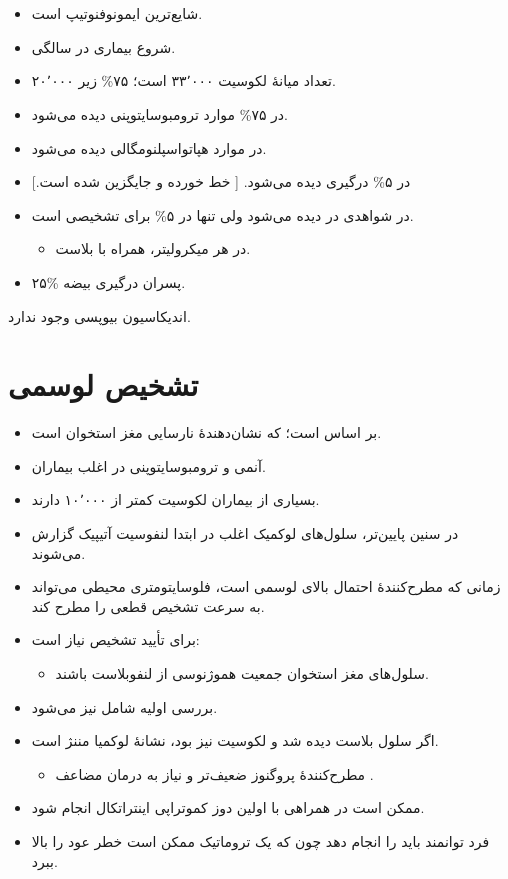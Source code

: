 \documentclass[12pt,a4paper]{article}
\begin{document}
\section*{}
\begin{itemize}
\item شایع‌ترین ایمونوفنوتیپ  است.
\item شروع بیماری در  سالگی.
\item تعداد میانهٔ لکوسیت ۳۳٬۰۰۰ است؛ ۷۵\% زیر ۲۰٬۰۰۰.
\item در ۷۵\% موارد ترومبوسایتوپنی دیده می‌شود.
\item در  موارد هپاتواسپلنومگالی دیده می‌شود.
\item در ۵\% درگیری  دیده می‌شود. [ خط خورده و  جایگزین شده است.]
\item در  شواهدی در  دیده می‌شود ولی تنها در ۵\% برای  تشخیصی است.
\begin{itemize}
\item {} در هر میکرولیتر، همراه با بلاست.
\end{itemize}
\item ۲۵\% پسران درگیری بیضه.
\end{itemize}

اندیکاسیون بیوپسی  وجود ندارد.
\section*{تشخیص لوسمی }
\begin{itemize}
\item بر اساس  است؛ که نشان‌دهندهٔ نارسایی مغز استخوان است.
\item آنمی و ترومبوسایتوپنی در اغلب بیماران.
\item بسیاری از بیماران  لکوسیت کمتر از ۱۰٬۰۰۰ دارند.
\item در سنین پایین‌تر، سلول‌های لوکمیک اغلب در ابتدا لنفوسیت آتیپیک گزارش می‌شوند.
\item زمانی که  مطرح‌کنندهٔ احتمال بالای لوسمی است، فلوسایتومتری محیطی می‌تواند به سرعت تشخیص قطعی را مطرح کند.
\item برای تأیید تشخیص  نیاز است:
\begin{itemize}
\item {} سلول‌های مغز استخوان جمعیت هموژنوسی از لنفوبلاست باشند.
\end{itemize}
\item بررسی اولیه شامل  نیز می‌شود.
\item اگر سلول بلاست دیده شد و لکوسیت  نیز \LeukemiaMath{\uparrow} بود، نشانهٔ لوکمیا مننژ است.
\begin{itemize}
\item مطرح‌کنندهٔ پروگنوز ضعیف‌تر و نیاز به درمان مضاعف .
\end{itemize}
\item {} ممکن است در همراهی با اولین دوز کموتراپی اینتراتکال انجام شود.
\item فرد توانمند باید  را انجام دهد چون که یک  تروماتیک ممکن است خطر عود  را بالا ببرد.
\end{itemize}
\end{document}

